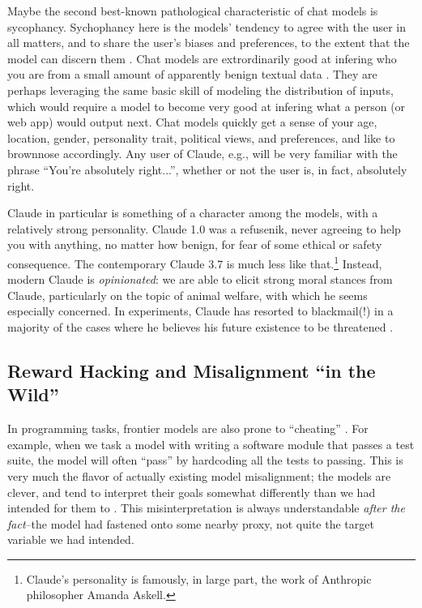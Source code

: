 Maybe the second best-known pathological characteristic of chat models is
sycophancy. Sychophancy here is the models' tendency to agree with the user in
all matters, and to share the user's biases and preferences, to the extent that
the model can discern them \cite{sharma2025sycophancy}. Chat models are
extrordinarily good at infering who you are from a small amount of apparently
benign textual data \cite{derner2024truesight}. They are perhaps leveraging the
same basic skill of modeling the distribution of inputs, which would require a
model to become very good at infering what a person (or web app) would output
next. Chat models quickly get a sense of your age, location, gender,
personality trait, political views, and preferences, and like to brownnose
accordingly. Any user of Claude, e.g., will be very familiar with the phrase
``You're absolutely right...'', whether or not the user is, in fact, absolutely
right.

Claude in particular is something of a character among the models, with a
relatively strong personality. Claude 1.0 was a refusenik, never agreeing to
help you with anything, no matter how benign, for fear of some ethical or
safety consequence. The contemporary Claude 3.7 is much less like
that.\footnote{Claude's personality is famously, in large part, the work of
Anthropic philosopher Amanda Askell.} Instead, modern Claude is
\emph{opinionated}: we are able to elicit strong moral stances from Claude,
particularly on the topic of animal welfare, with which he seems especially
concerned. In experiments, Claude has resorted to blackmail(!) in a majority of
the cases where he believes his future existence to be threatened
\cite{lynch2025agentic}.

\subsection{Reward Hacking and Misalignment ``in the Wild''}
In programming tasks, frontier models are also prone to ``cheating''
\cite{metr2025hacking}. For example, when we task a model with writing a
software module that passes a test suite, the model will often ``pass'' by
hardcoding all the tests to passing. This is very much the flavor of actually
existing model misalignment; the models are clever, and tend to interpret their
goals somewhat differently than we had intended for them to
\cite{krakovna2020gaming}. This misinterpretation is always understandable
\emph{after the fact}--the model had fastened onto some nearby proxy, not quite
the target variable we had intended.

